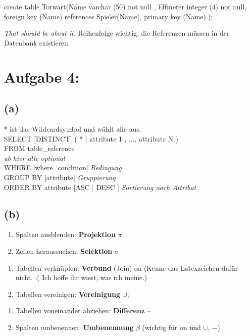 \documentclass[11pt]{article} %
\begin{document}
create table Torwart(Name varchar (50) not null , Elfmeter integer (4) not null, foreign key (Name) references Spieler(Name),  primary key (Name) );

\textit{That should be about it.}
Reihenfolge wichtig, die Referenzen müssen in der Datenbank existieren.

\section*{\textbf{Aufgabe 4:}}
\subsection*{(a)}
* ist das Wildcardsymbol und wählt alle aus.\\
SELECT [DISTINCT] ( * $|$ attribute 1 , ..., attribute N )
\\
FROM table\_reference
\\
\textit{ab hier alle optional}\\
  WHERE [where\_condition]  \textit{\small Bedingung}
\\
GROUP BY [attribute] \textit{\small Gruppierung} \\ 
ORDER BY attribute [ASC $|$ DESC  ] \textit{\small Sortierung nach Attribut}\\
\subsection*{(b)}
\begin{enumerate}
	\item  Spalten ausblenden: \textbf{Projektion} $\pi$
	
	\item  Zeilen heraussuchen: \textbf{Selektion} $\sigma$
\end{enumerate}

\noindent 

\begin{enumerate}
	\item  Tabellen verkn\"{u}pfen: \textbf{Verbund} (Join) on  (Kenne das Latexzeichen dafür nicht. :( Ich hoffe ihr wisst, was ich meine.)
	
	\item  Tabellen vereinigen: \textbf{Vereinigung} $\mathrm{\cup }$;
\end{enumerate}

\noindent 

\begin{enumerate}
	\item  Tabellen voneinander abziehen: \textbf{Differenz} --
	
	\item  Spalten umbenennen: \textbf{Umbenennung} $\beta$ (wichtig f\"{u}r on und $\mathrm{\cup }$, $\mathrm{-}$)
\end{enumerate}
\end{document}
